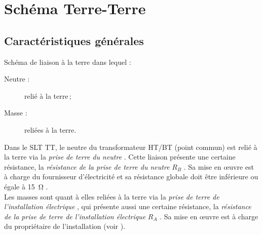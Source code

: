 

\begin{comment}

\documentclass[a4paper, 11pt, twoside, fleqn]{memoir}

\usepackage{AOCDTF}



	\openleft %

\end{comment}

\chapter{Schéma Terre-Terre}
\ChapFrame

\section{Caractéristiques générales}

\begin{definition}[Schéma TT]
Schéma de liaison à la terre dans lequel :
\begin{description}
\item[Neutre :] relié à la terre\,;
\item[Masse :] reliées à la terre.
\end{description}
\end{definition}

Dans le SLT TT, le neutre du transformateur HT/BT (point commun) est relié à la terre via la \emph{prise de terre du neutre} . Cette liaison présente une certaine résistance, la \emph{résistance de la prise de terre du neutre} $R_B$ . Sa mise en \oe{}uvre est à charge du fournisseur d'électricité et sa résistance globale doit être inférieure ou égale à \SI{15}{\ohm} \supercite{NF:C13-100-2015}.\\
Les masses sont quant à elles reliées à la terre via la \emph{prise de terre de l'installation électrique} , qui présente aussi une certaine résistance, la \emph{résistance de la prise de terre de l'installation électrique} $R_A$ . Sa mise en \oe{}uvre est à charge du propriétaire de l'installation (voir ).\\ 

